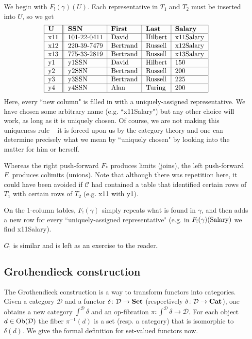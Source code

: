 \documentclass{amsart}
\def\tn{\textnormal}
\def\mc{\mathcal}
\def\Ob{\tn{Ob}}
\def\to{\rightarrow}
\def\taking{\colon}
\def\m1{{-1}}
\def\Cat{{\bf Cat}}
\def\Set{{\bf Set}}
\def\mcC{\mc{C}}
\def\mcD{\mc{D}}
\theoremstyle{remark}
\theoremstyle{definition}
\begin{document}
We begin with $F_!(\gamma)(U)$.  Each representative in $T_1$ and $T_2$ must be inserted into $U$, so we get  \begin{align*}\begin{tabular}{| l || l | l | l | l |}\hline {\bf U}&{\bf SSN}&{\bf First}&{\bf Last}&{\bf Salary}\\\hline x11&101-22-0411&David&Hilbert&x11Salary\\\hline x12&220-39-7479&Bertrand&Russell&x12Salary\\\hline x13&775-33-2819&Bertrand&Russell&x13Salary\\\hline y1&y1SSN&David&Hilbert&150\\\hline y2&y2SSN&Bertrand&Russell&200\\\hline y3&y3SSN&Bertrand&Russell&225\\\hline y4&y4SSN&Alan&Turing&200\\\hline\end{tabular}\end{align*}  Here, every ``new column" is filled in with a uniquely-assigned representative.  We have chosen some arbitrary name (e.g. ``x11Salary") but any other choice will work, as long as it is uniquely chosen.  Of course, we are not making this uniqueness rule -- it is forced upon us by the category theory and one can determine precisely what we mean by ``uniquely chosen" by looking into the matter for him or herself.

Whereas the right push-forward $F_*$ produces limits (joins), the left push-forward $F_!$ produces colimits (unions).  Note that although there was repetition here, it could have been avoided if $\mcC$ had contained a table that identified certain rows of $T_1$ with certain rows of $T_2$ (e.g. x11 with y1).

On the 1-column tables, $F_!(\gamma)$ simply repeats what is found in $\gamma$, and then adds a new row for every ``uniquely-assigned representative" (e.g. in $F_!(\gamma)(\tn{Salary})$ we find x11Salary). 

$G_!$ is similar and is left as an exercise to the reader.

\subsection{Grothendieck construction}

The Grothendieck construction is a way to transform functors into categories.  Given a category $\mcD$ and a functor $\delta\taking\mcD\to\Set$ (respectively $\delta\taking\mcD\to\Cat$), one obtains a new category $\int^{\mcD}\delta$ and an op-fibration $\pi\taking\int^\mcD\delta\to\mcD$.  For each object $d\in\Ob(\mcD)$ the fiber $\pi^\m1(d)$ is a set (resp. a category) that is isomorphic to $\delta(d)$.  We give the formal definition for set-valued functors now.
\end{document}
